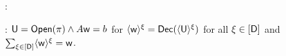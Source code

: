 \begin{figure*}[h!]
	{\footnotesize
		\begin{framed}
			:
			
			: $\mathsf{U}=\mathsf{Open}(\pi)\wedge A\mathsf{w}=b$ for $\langle{\mathsf{w}}\rangle^\xi=\mathsf{Dec}(\langle{\mathsf{U}}\rangle^\xi)$ for all $\xi \in [\mathsf{D}]$ and $\sum_{\xi\in[\mathsf{D}]} \langle{\mathsf{w}}\rangle^\xi = \mathsf{w}$.
			

\end{framed}}
\end{figure*}
